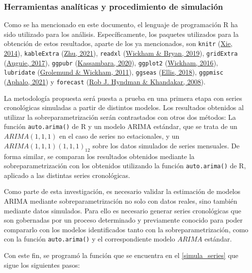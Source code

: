 \documentclass[
]{article}
\begin{document}
\subsubsection{Herramientas analíticas y procedimiento de simulación}

Como se ha mencionado en este documento, el lenguaje de programación R
ha sido utilizado para los análisis. Específicamente, los paquetes
utilizados para la obtención de estos resultados, aparte de los ya
mencionados, son \texttt{knitr} (\protect\hyperlink{ref-knitr}{Xie,
2014}), \texttt{kableExtra} (\protect\hyperlink{ref-kableExtra}{Zhu,
2021}), \texttt{readxl} (\protect\hyperlink{ref-readxl}{Wickham \&
Bryan, 2019}), \texttt{gridExtra}
(\protect\hyperlink{ref-gridExtra}{Auguie, 2017}), \texttt{ggpubr}
(\protect\hyperlink{ref-ggpubr}{Kassambara, 2020}), \texttt{ggplot2}
(\protect\hyperlink{ref-ggplot2}{Wickham, 2016}), \texttt{lubridate}
(\protect\hyperlink{ref-lubridate}{Grolemund \& Wickham, 2011}),
\texttt{ggseas} (\protect\hyperlink{ref-ggseas}{Ellis, 2018}),
\texttt{ggpmisc} (\protect\hyperlink{ref-ggpmisc}{Aphalo, 2021}) y
\texttt{forecast} (\protect\hyperlink{ref-forecast}{Rob J. Hyndman \&
Khandakar, 2008}).

La metodología propuesta será puesta a prueba en una primera etapa con
series cronológicas simuladas a partir de distintos modelos. Los
resultados obtenidos al utilizar la sobreparametrización serán
contrastados con otros dos métodos: La función \texttt{auto.arima()} de
R y un modelo ARIMA estándar, que se trata de un \(ARIMA(1,1,1)\) en el
caso de series no estacionales, y un \(ARIMA(1,1,1)(1,1,1)_{12}\) sobre
los datos simulados de series mensuales. De forma similar, se comparan
los resultados obtenidos mediante la sobreparametrización con los
obtenidos utilizando la función \texttt{auto.arima()} de R, aplicado a
las distintas series cronológicas.

Como parte de esta investigación, es necesario validar la estimación de
modelos ARIMA mediante sobreparametrización no solo con datos reales,
sino también mediante datos simulados. Para ello es necesario generar
series cronológicas que son gobernadas por un proceso determinado y
previamente conocido para poder compararlo con los modelos identificados
tanto con la sobreparametrización, como con la función
\texttt{auto.arima()} y el correspondiente modelo \(ARIMA\) estándar.

Con este fin, se programó la función que se encuentra en el
\ref{simula_series} que sigue los siguientes pasos:
\end{document}

